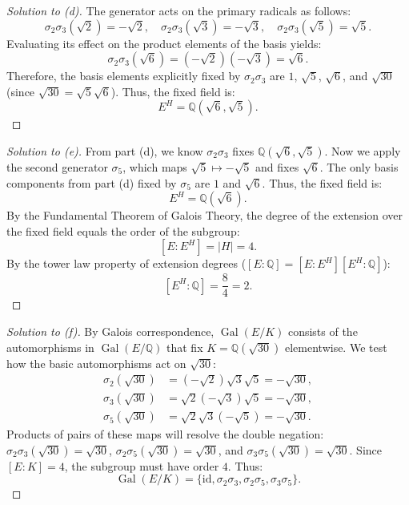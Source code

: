 \begin{proof}[Solution to (d)]
    The generator acts on the primary radicals as follows:
    \[
        \sigma_2\sigma_3(\sqrt{2}) = -\sqrt{2}, \quad \sigma_2\sigma_3(\sqrt{3}) = -\sqrt{3}, \quad \sigma_2\sigma_3(\sqrt{5}) = \sqrt{5}.
    \]
    Evaluating its effect on the product elements of the basis yields:
    \[
        \sigma_2\sigma_3(\sqrt{6}) = (-\sqrt{2})(-\sqrt{3}) = \sqrt{6}.
    \]
    Therefore, the basis elements explicitly fixed by $\sigma_2\sigma_3$ are $1$, $\sqrt{5}$, $\sqrt{6}$, and $\sqrt{30}$ (since $\sqrt{30} = \sqrt{5}\sqrt{6}$). Thus, the fixed field is:
    \[
        E^H = \mathbb Q(\sqrt{6}, \sqrt{5}).
    \]
\end{proof}

\begin{proof}[Solution to (e)]
    From part (d), we know $\sigma_2\sigma_3$ fixes $\mathbb Q(\sqrt{6}, \sqrt{5})$. Now we apply the second generator $\sigma_5$, which maps $\sqrt{5} \mapsto -\sqrt{5}$ and fixes $\sqrt{6}$. The only basis components from part (d) fixed by $\sigma_5$ are $1$ and $\sqrt{6}$. Thus, the fixed field is:
    \[
        E^H = \mathbb Q(\sqrt{6}).
    \]
    By the Fundamental Theorem of Galois Theory, the degree of the extension over the fixed field equals the order of the subgroup:
    \[
        [E:E^H] = |H| = 4.
    \]
    By the tower law property of extension degrees ($[E:\mathbb Q] = [E:E^H][E^H:\mathbb Q]$):
    \[
        [E^H:\mathbb Q] = \frac{8}{4} = 2.
    \]
\end{proof}

\begin{proof}[Solution to (f)]
        By Galois correspondence, $\operatorname{Gal}(E/K)$ consists of the automorphisms in $\operatorname{Gal}(E/\mathbb Q)$ that fix $K = \mathbb Q(\sqrt{30})$ elementwise. We test how the basic automorphisms act on $\sqrt{30}$:
        \begin{align*}
            \sigma_2(\sqrt{30}) &= (-\sqrt{2})\sqrt{3}\sqrt{5} = -\sqrt{30}, \\
            \sigma_3(\sqrt{30}) &= \sqrt{2}(-\sqrt{3})\sqrt{5} = -\sqrt{30}, \\
            \sigma_5(\sqrt{30}) &= \sqrt{2}\sqrt{3}(-\sqrt{5}) = -\sqrt{30}.
        \end{align*}
        Products of pairs of these maps will resolve the double negation: $\sigma_2\sigma_3(\sqrt{30}) = \sqrt{30}$, $\sigma_2\sigma_5(\sqrt{30}) = \sqrt{30}$, and $\sigma_3\sigma_5(\sqrt{30}) = \sqrt{30}$. Since $[E:K] = 4$, the subgroup must have order $4$. Thus:
        \[
            \operatorname{Gal}(E/K) = \{\text{id}, \sigma_2\sigma_3, \sigma_2\sigma_5, \sigma_3\sigma_5\}.
        \]
\end{proof}

